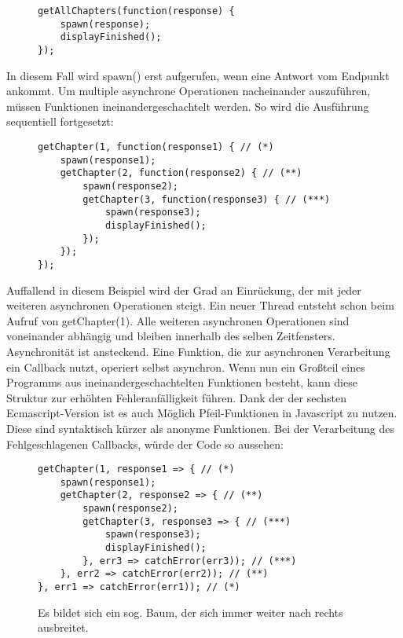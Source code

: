 \begin{figure}[H]
\begin{lstlisting}[basicstyle=\small]
getAllChapters(function(response) {
    spawn(response);
    displayFinished();
});
\end{lstlisting}
\end{figure}

\noindent
In diesem Fall wird spawn() erst aufgerufen, wenn eine Antwort vom Endpunkt ankommt. Um multiple asynchrone Operationen nacheinander auszuführen, müssen Funktionen ineinandergeschachtelt werden. So wird die Ausführung sequentiell fortgesetzt:

\begin{figure}[H]
\begin{lstlisting}[basicstyle=\small]
getChapter(1, function(response1) { // (*)
    spawn(response1);
    getChapter(2, function(response2) { // (**)
        spawn(response2);
        getChapter(3, function(response3) { // (***)
            spawn(response3);
            displayFinished();
        });
    });
});
\end{lstlisting}
\end{figure}

\noindent
Auffallend in diesem Beispiel wird der Grad an Einrückung, der mit jeder weiteren asynchronen Operationen steigt. Ein neuer Thread entsteht schon beim Aufruf von getChapter(1). Alle weiteren asynchronen Operationen sind voneinander abhängig und bleiben innerhalb des selben Zeitfensters. Asynchronität ist ansteckend. Eine Funktion, die zur asynchronen Verarbeitung ein Callback nutzt, operiert selbst asynchron. Wenn nun ein Großteil eines Programms aus ineinandergeschachtelten Funktionen besteht, kann diese Struktur zur erhöhten Fehleranfälligkeit führen. Dank der der sechsten Ecmascript-Version ist es auch Möglich Pfeil-Funktionen in Javascript zu nutzen. Diese sind syntaktisch kürzer als anonyme Funktionen. Bei der Verarbeitung des Fehlgeschlagenen Callbacks, würde der Code so aussehen:

\begin{figure}[H]
\begin{lstlisting}[basicstyle=\small]
getChapter(1, response1 => { // (*)
    spawn(response1);
    getChapter(2, response2 => { // (**)
        spawn(response2);
        getChapter(3, response3 => { // (***)
            spawn(response3);
            displayFinished();
        }, err3 => catchError(err3)); // (***)
    }, err2 => catchError(err2)); // (**)
}, err1 => catchError(err1)); // (*)
\end{lstlisting}
\caption{Es bildet sich ein sog. Baum, der sich immer weiter nach rechts ausbreitet.}
\end{figure}

